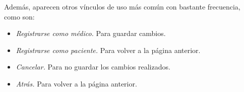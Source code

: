 \documentclass[a4paper,oneside,11pt]{book}
\begin{document}
		Además, aparecen otros vínculos de uso más común con bastante frecuencia, como son:
		\begin{itemize}
			\item \textit{Registrarse como médico.} Para guardar cambios.
			\item \textit{Registrarse como paciente.} Para volver a la página anterior.
			\item \textit{Cancelar.} Para no guardar los cambios realizados.
			\item \textit{Atrás.} Para volver a la página anterior.
		\end{itemize}	
		
		

	
	
	
	
\end{document}
